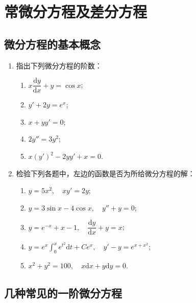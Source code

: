 \chapter{常微分方程及差分方程}\label{cha:5}



\section{微分方程的基本概念}

\begin{enumerate}\setlength{\itemsep}{7pt}
    \item 指出下列微分方程的阶数：
    \begin{enumerate}[(1)]\setlength{\itemsep}{5pt}\setlength{\topsep}{15pt}
        \item $x\dfrac{\text{d}y}{\text{d}x}+y=\cos x$;
        \item $y'+2y=e^x$;
        \item $x+yy'=0$;
        \item $2y''=3y^2$;
        \item $x(y')^2-2yy'+x=0$.
    \end{enumerate}

    \item 检验下列各题中，左边的函数是否为所给微分方程的解：
    \begin{enumerate}[(1)]\setlength{\itemsep}{5pt}\setlength{\topsep}{15pt}
        \item $y=5x^2,\quad xy'=2y$;
        \item $y=3\sin x-4\cos x,\quad y''+y=0$;
        \item $y=e^{-x}+x-1,\quad\dfrac{\text{d}y}{\text{d}x}+y=x$;
        \item $\displaystyle y=e^{x}\int_0^{x}e^{t^2}\text{d}t+Ce^x,\quad y'-y=e^{x+x^2}$;
        \item $x^2+y^2=100,\quad x\text{d}x+y\text{d}y=0$.
    \end{enumerate}


\end{enumerate}

\section{几种常见的一阶微分方程}

